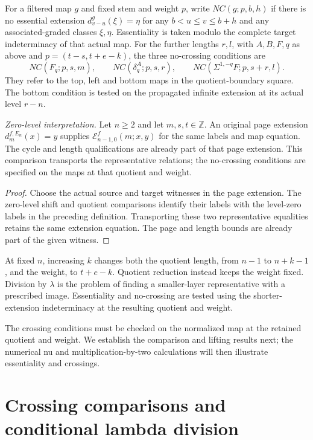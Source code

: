 \begin{definition}
For a filtered map $g$ and fixed stem and weight $p$, write $NC(g;p,b,h)$ if there is no essential extension $d_{v-u}^g(\xi)=\eta$ for any $b<u\le v\le b+h$ and any associated-graded classes $\xi,\eta$. Essentiality is taken modulo the complete target indeterminacy of that actual map. For the further lengths $r,l$, with $A,B,F,q$ as above and $p=(t-s,t+e-k)$, the three no-crossing conditions are
\[
NC(F_q;p,s,m),\qquad NC(\delta_q^A;p,s,r),\qquad
NC(\Sigma^{1,-q}F;p,s+r,l).
\]
They refer to the top, left and bottom maps in the quotient-boundary square. The bottom condition is tested on the propagated infinite extension
at its actual level $r-n$.

\textit{Zero-level interpretation.}
Let $n\ge2$ and let $m,s,t\in\mathbb Z$. An original page extension
$d_m^{f,E_n}(x)=y$ supplies
$\mathcal E^f_{n-1,0}(m;x,y)$ for the same labels and map equation.
The cycle and length qualifications are already part of that page
extension. This comparison transports the representative relations;
the no-crossing conditions are specified on the maps at that quotient and weight.
\end{definition}
\begin{proof}
Choose the actual source and target witnesses in the page extension.
The zero-level shift and quotient comparisons identify their labels
with the level-zero labels in the preceding definition. Transporting
these two representative equalities retains the same extension equation.
The page and length bounds are already part of the given witness.
\end{proof}


At fixed $n$, increasing $k$ changes both the quotient length, from
$n-1$ to $n+k-1$, and the weight, to $t+e-k$. Quotient reduction instead
keeps the weight fixed. Division by $\lambda$ is the problem of finding a smaller-layer
representative with a prescribed image. Essentiality and no-crossing are
tested using the shorter-extension indeterminacy at the resulting quotient
and weight.

The crossing conditions must be checked on the normalized map at the
retained quotient and weight. We establish the comparison and lifting
results next; the numerical nu and multiplication-by-two calculations
will then illustrate essentiality and crossings.

\section{Crossing comparisons and conditional lambda division}

